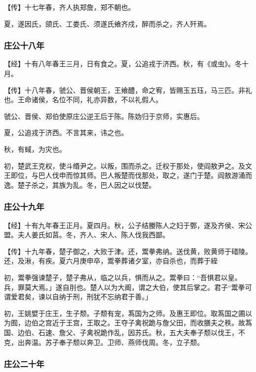 \documentclass[]{article}
\begin{document}
【传】十七年春，齐人执郑詹，郑不朝也。

夏，遂因氏，颌氏、工娄氏、须遂氏飨齐戍，醉而杀之，齐人歼焉。

\hypertarget{header-n489}{%
\subsubsection{庄公十八年}\label{header-n489}}

【经】十有八年春王三月，日有食之。夏，公追戎于济西。秋，有《或虫》。冬十月。

【传】十八年春，虢公、晋侯朝王，王飨醴，命之宥，皆赐玉五珏，马三匹。非礼也。王命诸侯，名位不同，礼亦异数，不以礼假人。

虢公、晋侯、郑伯使原庄公逆王后于陈。陈妫归于京师，实惠后。

夏，公追戎于济西。不言其来，讳之也。

秋，有蜮，为灾也。

初，楚武王克权，使斗缗尹之。以叛，围而杀之。迁权于那处，使阎敖尹之。及文王即位，与巴人伐申而惊其师。巴人叛楚而伐那处，取之，遂门于楚。阎敖游涌而逸。楚子杀之，其族为乱。冬，巴人因之以伐楚。

\hypertarget{header-n498}{%
\subsubsection{庄公十九年 }\label{header-n498}}

【经】十有九年春王正月。夏四月。秋，公子结媵陈人之妇于鄄，遂及齐侯、宋公盟。夫人姜氏如莒。冬，齐人、宋人、陈人伐我西鄙。

【传】十九年春，楚子御之，大败于津。还，鬻拳弗纳。送伐黄，败黄师于碏陵。还，及湫，有疾。夏六月庚申卒，鬻拳葬诸夕室，亦自杀也，而葬于絰

初，鬻拳强谏楚子，楚子弗从，临之以兵，惧而从之。鬻拳曰：``吾惧君以皇。兵，罪莫大焉。」遂自刖也。楚人以为大阍，谓之大伯，使其后掌之。君子``鬻拳可谓爱君矣，谏以自纳于刑，刑犹不忘纳君于善。」

初，王姚嬖于庄王，生子颓。子颓有宠，蒍国为之师。及惠王即位。取蒍国之圃以为囿，边伯之宫近于王宫，王取之。王夺子禽祝跪与詹父田，而收膳夫之秩。故蒍国、边伯、石速、詹父、子禽祝跪作乱，因苏氏。秋，五大夫奉子颓以伐王，不克，出奔温。苏子奉子颓以奔卫。卫师、燕师伐周。冬，立子颓。

\hypertarget{header-n505}{%
\subsubsection{庄公二十年 }\label{header-n505}}
\end{document}
